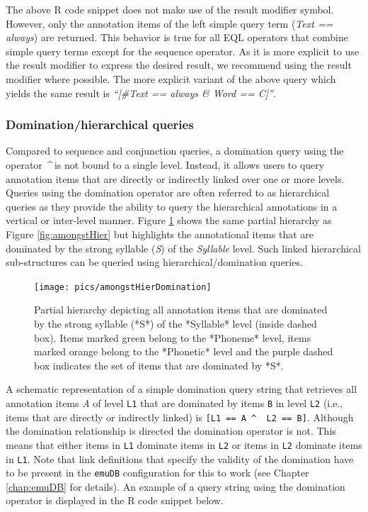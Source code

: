 \documentclass[]{book}
\begin{document}
The above R code snippet does not make use of the result modifier symbol. However, only the annotation items of the left simple query term (\emph{Text == always}) are returned. This behavior is true for all EQL operators that combine simple query terms except for the sequence operator. As it is more explicit to use the result modifier to express the desired result, we recommend using the result modifier where possible. The more explicit variant of the above query which yields the same result is \emph{``{[}\#Text == always \& Word == C{]}''}.

\hypertarget{subsubsec:query_dominationQueries}{%
\subsubsection{Domination/hierarchical queries}\label{subsubsec:query_dominationQueries}}

Compared to sequence and conjunction queries, a domination query using the operator \emph{\^{}} is not bound to a single level. Instead, it allows users to query annotation items that are directly or indirectly linked over one or more levels. Queries using the domination operator are often referred to as hierarchical queries as they provide the ability to query the hierarchical annotations in a vertical or inter-level manner. Figure \ref{fig:amongstHierDomintation} shows the same partial hierarchy as Figure \ref{fig:amongstHier} but highlights the annotational items that are dominated by the strong syllable (\emph{S}) of the \emph{Syllable} level. Such linked hierarchical sub-structures can be queried using hierarchical/domination queries.

\begin{figure}

{\centering \texttt{[image: pics/amongstHierDomination]} 

}

\caption{Partial hierarchy depicting all annotation items that are dominated by the strong syllable (*S*) of the *Syllable* level (inside dashed box). Items marked green belong to the *Phoneme* level, items marked orange belong to the *Phonetic* level and the purple dashed box indicates the set of items that are dominated by *S*.}\label{fig:amongstHierDomintation}
\end{figure}

A schematic representation of a simple domination query string that retrieves all annotation items \emph{A} of level \texttt{L1} that are dominated by items \texttt{B} in level \texttt{L2} (i.e., items that are directly or indirectly linked) is \texttt{{[}L1\ ==\ A\ \^{}\ \ L2\ ==\ B{]}}. Although the domination relationship is directed the domination operator is not. This means that either items in \texttt{L1} dominate items in \texttt{L2} or items in \texttt{L2} dominate items in \texttt{L1}. Note that link definitions that specify the validity of the domination have to be present in the \texttt{emuDB} configuration for this to work (see Chapter \ref{chap:emuDB} for details). An example of a query string using the domination operator is displayed in the R code snippet below.
\end{document}
